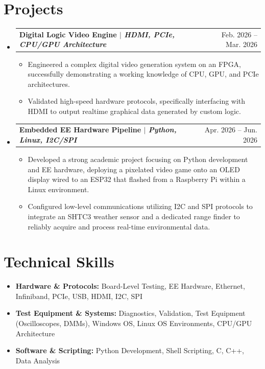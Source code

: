 \documentclass[letterpaper,11pt]{article}
\makeatletter
\newcommand{\resumeItem}[1]{\item{#1}}
\newcommand{\resumeProjectHeading}[2]{
  \item
    \begin{tabular*}{0.97\textwidth}[t]{l@{\extracolsep{\fill}}r}
      \textbf{#1} & #2 \\
    \end{tabular*}
}
\newcommand{\resumeSubHeadingListStart}{\begin{itemize}[label=\textbullet]}
\newcommand{\resumeSubHeadingListEnd}{\end{itemize}}
\newcommand{\resumeItemListStart}{\begin{itemize}[label=-]}
\newcommand{\resumeItemListEnd}{\end{itemize}}
\makeatother
\begin{document}
\section{Projects}
\resumeSubHeadingListStart
  \resumeProjectHeading{Digital Logic Video Engine $\vert$ \emph{HDMI, PCIe, CPU/GPU Architecture}}{Feb. 2026 -- Mar. 2026}
  \resumeItemListStart
    \resumeItem{Engineered a complex digital video generation system on an FPGA, successfully demonstrating a working knowledge of CPU, GPU, and PCIe architectures.}
    \resumeItem{Validated high-speed hardware protocols, specifically interfacing with HDMI to output realtime graphical data generated by custom logic.}
  \resumeItemListEnd

  \resumeProjectHeading{Embedded EE Hardware Pipeline $\vert$ \emph{Python, Linux, I2C/SPI}}{Apr. 2026 -- Jun. 2026}
  \resumeItemListStart
    \resumeItem{Developed a strong academic project focusing on Python development and EE hardware, deploying a pixelated video game onto an OLED display wired to an ESP32 that flashed from a Raspberry Pi within a Linux environment.}
    \resumeItem{Configured low-level communications utilizing I2C and SPI protocols to integrate an SHTC3 weather sensor and a dedicated range finder to reliably acquire and process real-time environmental data.}
  \resumeItemListEnd
\resumeSubHeadingListEnd

\section{Technical Skills}
\resumeSubHeadingListStart
  \item{\textbf{Hardware \& Protocols:} Board-Level Testing, EE Hardware, Ethernet, Infiniband, PCIe, USB, HDMI, I2C, SPI}
  \item{\textbf{Test Equipment \& Systems:} Diagnostics, Validation, Test Equipment (Oscilloscopes, DMMs), Windows OS, Linux OS Environments, CPU/GPU Architecture}
  \item{\textbf{Software \& Scripting:} Python Development, Shell Scripting, C, C++, Data Analysis}
\resumeSubHeadingListEnd
\end{document}

